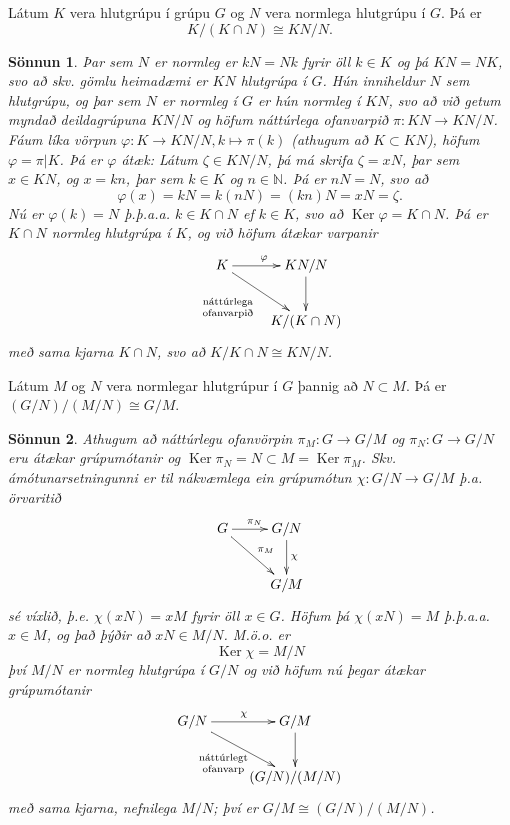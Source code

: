 \documentclass[a4paper,icelandic,11pt]{book}
\theoremstyle{plain}
\newtheorem*{sonnun}{Sönnun}
\newcommand{\N}{\mathbb{N}}
\DeclareMathOperator{\Ker}{Ker} %
\begin{document}
\begin{setn}
  Látum $K$ vera hlutgrúpu í grúpu $G$ og $N$ vera normlega hlutgrúpu í
  $G$. Þá er
  \begin{equation*}
    K/(K\cap N) \cong KN/N.
  \end{equation*}
\end{setn}
\begin{sonnun}
  Þar sem $N$ er normleg er $kN = Nk$ fyrir öll $k\in K$ og þá $KN = NK$, svo að
  skv. gömlu heimadæmi er $KN$ hlutgrúpa í $G$. Hún inniheldur $N$ sem
  hlutgrúpu, og þar sem $N$ er normleg í $G$ er hún normleg í $KN$, svo að við
  getum myndað deildagrúpuna $KN/N$ og höfum náttúrlega ofanvarpið $\pi: KN \to
  KN/N$. Fáum líka vörpun $\varphi:K\to KN/N, k\mapsto \pi(k)$ (athugum að
  $K\subset KN$), höfum $\varphi = \pi|K$. Þá er $\varphi$ átæk: Látum
  $\zeta\in KN/N$, þá má skrifa $\zeta = xN$, þar sem $x\in KN$, og $x = kn$,
  þar sem $k\in K$ og $n\in \N$. Þá er $nN = N$, svo að 
  \[
  \varphi(x) = kN = k(nN) = (kn)N = xN = \zeta.
  \]
  Nú er $\varphi(k) = N$ þ.þ.a.a. $k\in K\cap N$ ef $k\in K$, svo að
  $\Ker\varphi = K\cap N$. Þá er $K\cap N$ normleg hlutgrúpa í $K$, og við höfum
  átækar varpanir
  \[
  \xymatrix{
  K\ar[r]^\varphi \ar[dr]_{\txt<6pc>{\scriptsize{náttúrlega ofanvarpið}}}
  & KN/N \ar[d] \\
  & K/(K\cap N)
  }
  \]
  með sama kjarna $K\cap N$, svo að $K/K\cap N \cong KN/N$.
\end{sonnun}
\begin{setn}
  Látum $M$ og $N$ vera normlegar hlutgrúpur í $G$ þannig að $N\subset M$. Þá er
  $(G/N)/(M/N)\cong G/M$.
\end{setn}
\begin{sonnun}
  Athugum að náttúrlegu ofanvörpin $\pi_M:G\to G/M$ og $\pi_N:G\to G/N$ eru
  átækar grúpumótanir og $\Ker\pi_N = N\subset M = \Ker\pi_M$. Skv.
  ámótunarsetningunni er til nákvæmlega ein grúpumótun $\chi:G/N\to G/M$ þ.a.
  örvaritið
  \[
  \xymatrix{
  G\ar[r]^{\pi_N} \ar[dr]^{\pi_M} & G/N \ar[d]^\chi \\
  & G/M
  }
  \]
  sé víxlið, þ.e. $\chi(xN)=xM$ fyrir öll $x\in G$. Höfum þá $\chi(xN) = M$
  þ.þ.a.a. $x\in M$, og það þýðir að $xN\in M/N$. M.ö.o. er
  \begin{equation*}
    \Ker\chi = M/N
  \end{equation*}
  því $M/N$ er normleg hlutgrúpa í $G/N$ og við höfum nú þegar átækar
  grúpumótanir
  \[
  \xymatrix{
  G/N\ar[r]^{\chi} \ar[dr]_{\txt<4pc>{\scriptsize{náttúrlegt ofanvarp}}}
  & G/M \ar[d] \\
  & (G/N)/(M/N) 
  }
  \]
  með sama kjarna, nefnilega $M/N$; því er $G/M\cong (G/N)/(M/N)$.
\end{sonnun}
\end{document}
